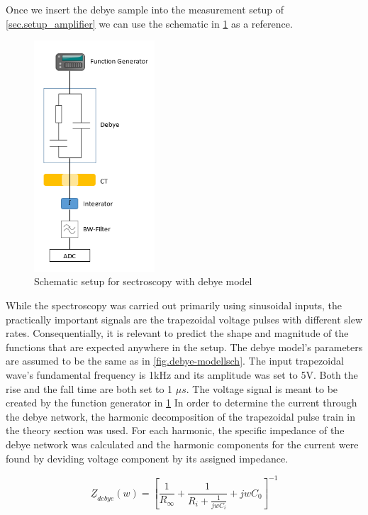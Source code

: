 Once we insert the debye sample into the measurement setup of \ref{sec.setup_amplifier} we can use the schematic in \ref{fig.presentation} as a reference.

\begin{figure}[h!tb]
	\centerline{\includegraphics[width=0.4\textwidth]{figures/Method/setup/low_voltage_setup.png}}	
	\caption{Schematic setup for sectroscopy with debye model}	
	\label{fig.presentation}
\end{figure}

While the spectroscopy was carried out primarily using sinusoidal inputs,
the practically important signals are the trapezoidal voltage pulses with different
slew rates. Consequentially, it is relevant to predict the shape and magnitude
of the functions that are expected anywhere in the setup. 
The debye model's parameters are assumed to be the same as in \ref{fig.debye-modellsch}.
The input trapezoidal wave's fundamental frequency is 1kHz and its amplitude was
set to 5V. Both the rise and 
the fall time are both set to 1 $\mu s$. The voltage signal is meant to be created
by the function generator in \ref{fig.presentation}
\newline
In order to determine the current through the debye network, the harmonic decomposition of
the trapezoidal pulse train in the theory section was used. For each harmonic, the specific
impedance of the debye network was calculated and the harmonic components for the current were found by deviding voltage component by its assigned impedance.

\begin{equation}
 \underline{Z}_{debye}(w)=\left[\frac{1}{R_{\infty}}+\frac{1}{R_{i}+\frac{1}{jwC_{i}}}+jwC_{0}\right]^{-1}
 \label{debyeimpedance}
\end{equation}

